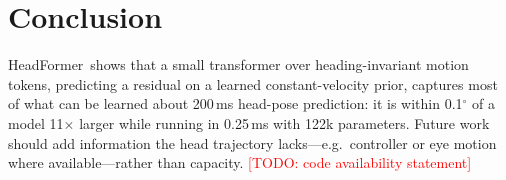 \documentclass[conference]{IEEEtran}
\newcommand{\todo}[1]{\textcolor{red}{[TODO: #1]}}
\newcommand{\ours}{HeadFormer}   %
\begin{document}
\section{Conclusion}
\ours\ shows that a small transformer over heading-invariant motion tokens, predicting a residual on a learned
constant-velocity prior, captures most of what can be learned about 200\,ms head-pose prediction: it is within 0.1$^\circ$ of a
model 11$\times$ larger while running in 0.25\,ms with 122k parameters. Future work should add information the head trajectory
lacks---e.g.\ controller or eye motion where available---rather than capacity. \todo{code availability statement}

\end{document}
